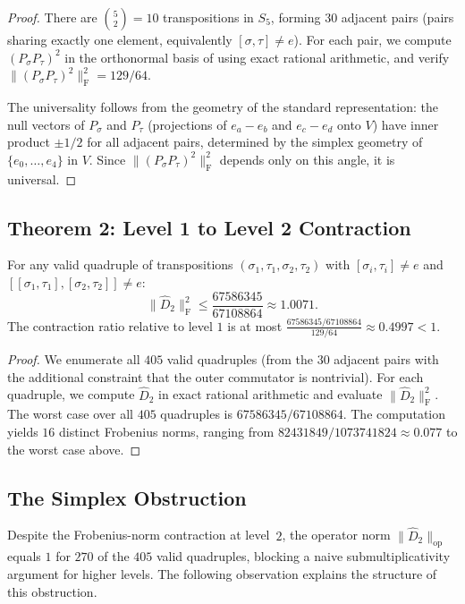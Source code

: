 \documentclass[version=submission]{iacrcc}
\newcommand{\norm}[1]{\lVert #1 \rVert}
\newcommand{\frob}[1]{\norm{#1}_{\mathrm{F}}}
\newcommand{\opn}[1]{\norm{#1}_{\mathrm{op}}}
\newcommand{\Dhat}{\widehat{D}}
\begin{document}
\begin{proof}
There are $\binom{5}{2} = 10$ transpositions in $S_5$, forming $30$ adjacent
pairs (pairs sharing exactly one element, equivalently $[\sigma,\tau] \neq e$).
For each pair, we compute $(P_\sigma P_\tau)^2$ in the orthonormal basis of
 using exact rational arithmetic, and verify
$\frob{(P_\sigma P_\tau)^2}^2 = 129/64$.

The universality follows from the geometry of the standard representation:
the null vectors of $P_\sigma$ and $P_\tau$ (projections of $e_a - e_b$ and
$e_c - e_d$ onto $V$) have inner product $\pm 1/2$ for all adjacent pairs,
determined by the simplex geometry of $\{e_0, \ldots, e_4\}$ in $V$.
Since $\frob{(P_\sigma P_\tau)^2}^2$ depends only on this angle, it is
universal.
\end{proof}


\subsection{Theorem 2: Level 1 to Level 2 Contraction}

\begin{theorem}
\label{thm:level12}
For any valid quadruple of transpositions $(\sigma_1, \tau_1, \sigma_2, \tau_2)$
with $[\sigma_i, \tau_i] \neq e$ and $[[\sigma_1,\tau_1], [\sigma_2,\tau_2]] \neq e$:
\[
\frob{\Dhat_2}^2 \leq \frac{67586345}{67108864} \approx 1.0071.
\]
The contraction ratio relative to level $1$ is at most
$\frac{67586345/67108864}{129/64} \approx 0.4997 < 1$.
\end{theorem}

\begin{proof}
We enumerate all $405$ valid quadruples (from the $30$ adjacent pairs with the
additional constraint that the outer commutator is nontrivial). For each quadruple,
we compute $\Dhat_2$ in exact rational arithmetic and evaluate $\frob{\Dhat_2}^2$.
The worst case over all $405$ quadruples is $67586345/67108864$.
The computation yields $16$ distinct Frobenius norms, ranging from
$82431849/1073741824 \approx 0.077$ to the worst case above.
\end{proof}


\subsection{The Simplex Obstruction}
\label{sec:simplex}

Despite the Frobenius-norm contraction at level~$2$, the operator norm
$\opn{\Dhat_2}$ equals $1$ for $270$ of the $405$ valid quadruples,
blocking a naive submultiplicativity argument for higher levels.
The following observation explains the structure of this obstruction.
\end{document}

